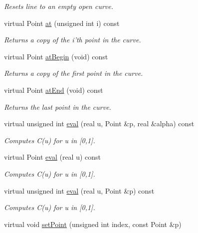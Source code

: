 \begin{DoxyCompactItemize}
\begin{DoxyCompactList}\small\item\em Resets line to an empty open curve. \end{DoxyCompactList}\item 
virtual Point \hyperlink{classPolygonalCurve_aaf62a3e7ae3ae2c7041388d8e101f0f3}{at} (unsigned int i) const 
\begin{DoxyCompactList}\small\item\em Returns a copy of the i'th point in the curve. \end{DoxyCompactList}\item 
virtual Point \hyperlink{classPolygonalCurve_ae16a161c5d0396cef59c5c3c24bbb6f9}{atBegin} (void) const 
\begin{DoxyCompactList}\small\item\em Returns a copy of the first point in the curve. \end{DoxyCompactList}\item 
virtual Point \hyperlink{classPolygonalCurve_a8a611c4ac7dc1b3102f3245c43696e65}{atEnd} (void) const 
\begin{DoxyCompactList}\small\item\em Returns the last point in the curve. \end{DoxyCompactList}\item 
virtual unsigned int \hyperlink{classPolygonalCurve_a4d5fdd3e90d89a9f216ef7310356ee9d}{eval} (real u, Point \&p, real \&alpha) const 
\begin{DoxyCompactList}\small\item\em Computes C(u) for u in \mbox{[}0,1\mbox{]}. \end{DoxyCompactList}\item 
virtual Point \hyperlink{classPolygonalCurve_aa409a3ec61dc24d91f7b8011e10f7be0}{eval} (real u) const 
\begin{DoxyCompactList}\small\item\em Computes C(u) for u in \mbox{[}0,1\mbox{]}. \end{DoxyCompactList}\item 
virtual unsigned int \hyperlink{classPolygonalCurve_adb8700436c7d9bf849708c64cb4facae}{eval} (real u, Point \&p) const 
\begin{DoxyCompactList}\small\item\em Computes C(u) for u in \mbox{[}0,1\mbox{]}. \end{DoxyCompactList}\item 
virtual void \hyperlink{classPolygonalCurve_ae594e388395411d9ef6aeae37de8f805}{setPoint} (unsigned int index, const Point \&p)

\end{DoxyCompactItemize}

